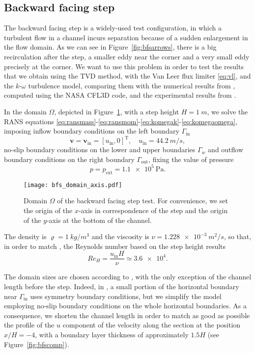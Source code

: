 \subsection{Backward facing step}
The backward facing step is a widely-used test configuration, in which a turbulent flow in a channel incurs separation because of a sudden enlargement in the flow domain. As we can see in Figure~\ref{fig:bfsarrows}, there is a big recirculation after the step, a smaller eddy near the corner and a very small eddy precisely at the corner. We want to use this problem in order to test the results that we obtain using the TVD method, with the Van Leer flux limiter \eqref{eq:vl}, and the $k\text{-}\omega$ turbulence model, comparing them with the numerical results from \cite{web:nasa}, computed using the NASA CFL3D code, and the experimental results from \cite{bfs:driver}.

In the domain $\Omega$, depicted in Figure~\ref{fig:bfsdomain}, with a step height $H=\SI{1}{m}$, we solve the RANS equations \eqref{eq:ransmass}-\eqref{eq:ransmom}-\eqref{eq:komegak}-\eqref{eq:komegaomega}, imposing inflow boundary conditions on the left boundary $\Gamma_\text{in}$
\begin{equation}
	\mathbf{v} = \mathbf{v}_\text{in} = [u_\text{in}, 0]^\mathrm{T}, \quad u_\text{in} = \SI{44.2}{m/s},
\end{equation} no-slip boundary conditions on the lower and upper boundaries $\Gamma_w$ and outflow boundary conditions on the right boundary $\Gamma_\text{out}$, fixing the value of pressure
\begin{equation}
	p = p_\text{ext} = \SI{1.1e5}{\pascal}.
\end{equation}
\begin{figure}
	\centering
	\texttt{[image: bfs\_domain\_axis.pdf]}
	\caption[Domain of the backward facing step test]{Domain $\Omega$ of the backward facing step test. For convenience, we set the origin of the $x$-axis in correspondence of the step and the origin of the $y$-axis at the bottom of the channel.}
	\label{fig:bfsdomain}
\end{figure}
The density is $\varrho = \SI{1}{kg/m^3}$ and the viscosity is $\nu=\SI{1.228e-3}{m^2/s}$, so that, in order to match \cite{web:nasa}, the Reynolds number based on the step height results
\begin{equation}
	Re_H = \frac{u_\text{in}H}{\nu} \simeq \num{3.6e4}.
\end{equation}

The domain sizes are chosen according to \cite{web:nasa}, with the only exception of the channel length before the step. Indeed, in \cite{web:nasa}, a small portion of the horizontal boundary near $\Gamma_\text{in}$ uses symmetry boundary conditions, but we simplify the model employing no-slip boundary conditions on the whole horizontal boundaries. As a consequence, we shorten the channel length in order to match as good as possible the profile of the $u$ component of the velocity along the section at the position $x/H=-4$, with a boundary layer thickness of approximately $1.5H$ (see Figure~\ref{fig:bfscomp}).

